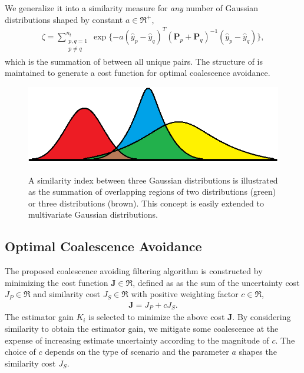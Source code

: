 We generalize it into a similarity measure for \emph{any} number of Gaussian distributions shaped by constant $a\in\Re^+$,%
\begin{align}
\label{eqn:zetaGeneral}
\zeta=\sum\limits_{\substack{p,q=1\\p\neq q}}^{n_t} \exp \{-a(\hat y_{p}- \hat y_{q})^T({\mathbf P}_{p}
+{\mathbf P}_{q})^{-1}(\hat y_{p}-\hat y_{q})\},
\end{align}
which is the summation of  between all unique pairs.
The structure of  is maintained to generate a cost function for optimal coalescence avoidance.
\begin{figure}
\centerline{
		{\includegraphics[width=.7\columnwidth]{GaussianDistOverlap1D.png}}
	}
\caption{A similarity index between three Gaussian distributions is illustrated as the summation of overlapping regions of two distributions (green) or three distributions (brown).
This concept is easily extended to multivariate Gaussian distributions.
}\label{fig:SimMeas}
\end{figure}

	
\subsection{Optimal Coalescence Avoidance}


The proposed coalescence avoiding filtering algorithm is constructed by minimizing the cost function $\mathbf{J}\in\Re$, defined as as the sum of the uncertainty cost $J_P\in\Re$ and similarity cost $J_S\in\Re$ with positive weighting factor $c\in\Re$,
\begin{align}
\label{eqn:CostGen}
\mathbf{J}=J_P+cJ_S.
\end{align}
The estimator gain $K_i$ is selected to minimize the above cost $\mathbf{J}$. By considering similarity to obtain the estimator gain, we mitigate some coalescence at the expense of increasing estimate uncertainty according to the magnitude of $c$.
The choice of $c$ depends on the type of scenario and the parameter $a$ shapes the similarity cost $J_S$.


